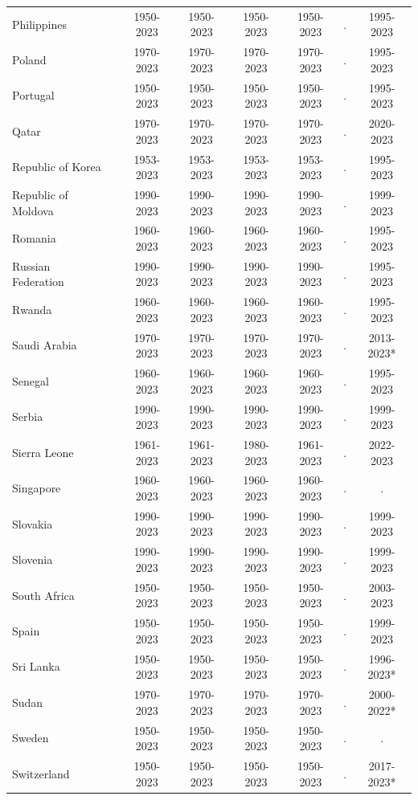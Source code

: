 \begin{longtable}{ll*{6}{c}}
Philippines &  & 1950-2023 & 1950-2023 & 1950-2023 & 1950-2023 & . & 1995-2023 \\
Poland &  & 1970-2023 & 1970-2023 & 1970-2023 & 1970-2023 & . & 1995-2023 \\
Portugal &  & 1950-2023 & 1950-2023 & 1950-2023 & 1950-2023 & . & 1995-2023 \\
Qatar &  & 1970-2023 & 1970-2023 & 1970-2023 & 1970-2023 & . & 2020-2023 \\
Republic of Korea &  & 1953-2023 & 1953-2023 & 1953-2023 & 1953-2023 & . & 1995-2023 \\
Republic of Moldova &  & 1990-2023 & 1990-2023 & 1990-2023 & 1990-2023 & . & 1999-2023 \\
Romania &  & 1960-2023 & 1960-2023 & 1960-2023 & 1960-2023 & . & 1995-2023 \\
Russian Federation &  & 1990-2023 & 1990-2023 & 1990-2023 & 1990-2023 & . & 1995-2023 \\
Rwanda &  & 1960-2023 & 1960-2023 & 1960-2023 & 1960-2023 & . & 1995-2023 \\
Saudi Arabia &  & 1970-2023 & 1970-2023 & 1970-2023 & 1970-2023 & . & 2013-2023* \\
Senegal &  & 1960-2023 & 1960-2023 & 1960-2023 & 1960-2023 & . & 1995-2023 \\
Serbia &  & 1990-2023 & 1990-2023 & 1990-2023 & 1990-2023 & . & 1999-2023 \\
Sierra Leone &  & 1961-2023 & 1961-2023 & 1980-2023 & 1961-2023 & . & 2022-2023 \\
Singapore &  & 1960-2023 & 1960-2023 & 1960-2023 & 1960-2023 & . & . \\
Slovakia &  & 1990-2023 & 1990-2023 & 1990-2023 & 1990-2023 & . & 1999-2023 \\
Slovenia &  & 1990-2023 & 1990-2023 & 1990-2023 & 1990-2023 & . & 1999-2023 \\
South Africa &  & 1950-2023 & 1950-2023 & 1950-2023 & 1950-2023 & . & 2003-2023 \\
Spain &  & 1950-2023 & 1950-2023 & 1950-2023 & 1950-2023 & . & 1999-2023 \\
Sri Lanka &  & 1950-2023 & 1950-2023 & 1950-2023 & 1950-2023 & . & 1996-2023* \\
Sudan &  & 1970-2023 & 1970-2023 & 1970-2023 & 1970-2023 & . & 2000-2022* \\
Sweden &  & 1950-2023 & 1950-2023 & 1950-2023 & 1950-2023 & . & . \\
Switzerland &  & 1950-2023 & 1950-2023 & 1950-2023 & 1950-2023 & . & 2017-2023* \\

\end{longtable}
